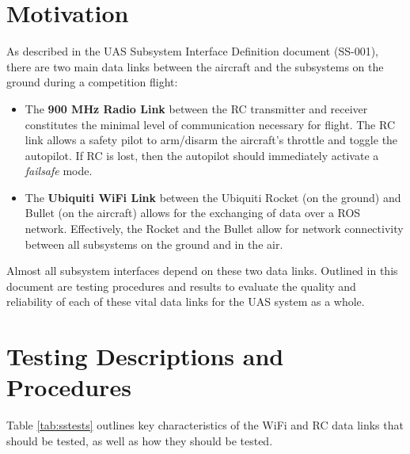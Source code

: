 \documentclass[]{auvsi_doc}
\begin{document}
\begin{AUVSITitlePage}
\begin{artifacttable}
\end{artifacttable}
\end{AUVSITitlePage}

\section{Motivation}

As described in the UAS Subsystem Interface Definition document (SS-001), there are two main data links between the aircraft and the subsystems on the ground during a competition flight:

\begin{itemize}
	\item The \textbf{900 MHz Radio Link} between the RC transmitter and receiver constitutes the minimal level of communication necessary for flight. The RC link allows a safety pilot to arm/disarm the aircraft's throttle and toggle the autopilot. If RC is lost, then the autopilot should immediately activate a \textit{failsafe} mode.
	\item The \textbf{Ubiquiti WiFi Link} between the Ubiquiti Rocket (on the ground) and Bullet (on the aircraft) allows for the exchanging of data over a ROS network. Effectively, the Rocket and the Bullet allow for network connectivity between all subsystems on the ground and in the air.
\end{itemize}

Almost all subsystem interfaces depend on these two data links. Outlined in this document are testing procedures and results to evaluate the quality and reliability of each of these vital data links for the UAS system as a whole.

\section{Testing Descriptions and Procedures}

Table \ref{tab:sstests} outlines key characteristics of the WiFi and RC data links that should be tested, as well as how they should be tested.
\end{document}
